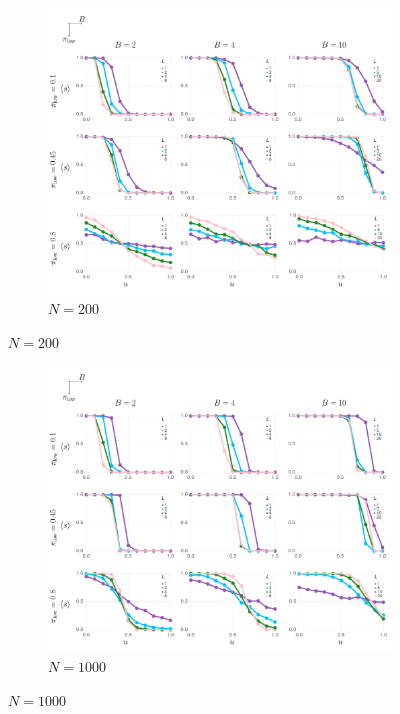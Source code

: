 \documentclass[letterpaper,11.5pt]{scrartcl}
\begin{document}
\begin{figure}
  \ContinuedFloat
	\begin{subfigure}{\textwidth}
	  \caption{$N=200$}
	  \includegraphics[width=\textwidth]{Figures/supplement/nagents=200/mainResultsPlots.pdf}
	\end{subfigure}
\end{figure}

\begin{figure}
  \ContinuedFloat
	\begin{subfigure}{\textwidth}
	  \caption{$N=1000$}
	  \includegraphics[width=\textwidth]{Figures/supplement/nagents=1000/mainResultsPlots.pdf}
	\end{subfigure}
\end{figure}
\end{document}
